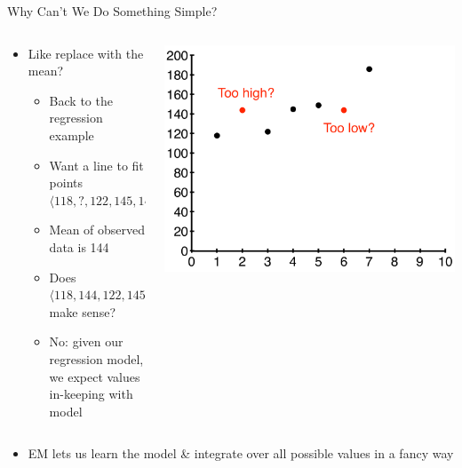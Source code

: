 \documentclass[aspectratio=169]{beamer}
\begin{document}
\begin{frame}{Why Can't We Do Something Simple?}

\begin{columns}[T]
\begin{column}{0.5\textwidth}
\begin{itemize}
\item Like replace with the mean?
\begin{itemize}
	\item Back to the regression example
	\item Want a line to fit points $\langle 118, ?, 122, 145, 149, ?, 186 \rangle$
	\item Mean of observed data is 144
	\item Does $\langle 118, 144, 122, 145, 149, 144, 186 \rangle$ make sense?
	\item No: given our regression model, we expect values in-keeping with model
\end{itemize}
\end{itemize}
\end{column}
\begin{column}{0.5\textwidth}
\includegraphics[width=1\textwidth]{lectEM/missingData1WithMean.pdf}
\end{column}
\end{columns}
\begin{itemize}
	\item EM lets us learn the model \& integrate over all possible values in a fancy way
\end{itemize}
\end{frame}
\end{document}
